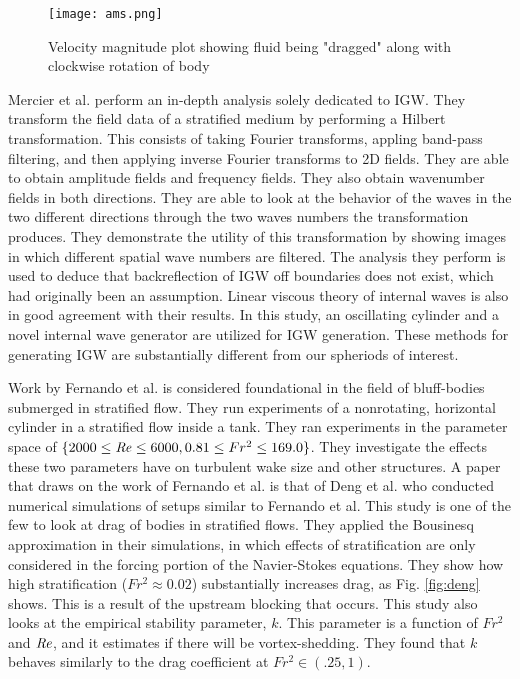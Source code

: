 \begin{figure}[htbp]
\centering
\texttt{[image: ams.png]}
\caption{Velocity magnitude plot showing fluid being "dragged" along with clockwise rotation of body \cite{mittal_direct_2020}}
\label{fig:ams}
\end{figure}

Mercier et al. \cite{mercier_reflection_2008} perform an in-depth analysis solely dedicated to IGW. They transform the field data of a stratified medium by performing a Hilbert transformation. This consists of taking Fourier transforms, appling band-pass filtering, and then applying inverse Fourier transforms to 2D fields. They are able to obtain amplitude fields and frequency fields. They also obtain wavenumber fields in both directions. They are able to look at the behavior of the waves in the two different directions through the two waves numbers the transformation produces. They demonstrate the utility of this transformation by showing images in which different spatial wave numbers are filtered. The analysis they perform is used to deduce that backreflection of IGW off boundaries does not exist, which had originally been an assumption. Linear viscous theory of internal waves is also in good agreement with their results. In this study, an oscillating cylinder and a novel internal wave generator are utilized for IGW generation. These methods for generating IGW are substantially different from our spheriods of interest. 

Work by Fernando et al. is considered foundational in the field of bluff-bodies submerged in stratified flow. They run experiments of a nonrotating, horizontal cylinder in a stratified flow inside a tank. They ran experiments in the parameter space of $\{2000 \leq \mathit{Re} \leq 6000, 0.81 \leq Fr^2 \leq  169.0\}$. They investigate the effects these two parameters have on turbulent wake size and other structures. A paper that draws on the work of Fernando et al. is that of Deng et al. \cite{deng_drag_2022} who conducted numerical simulations of setups similar to Fernando et al. This study is one of the few to look at drag of bodies in stratified flows. They applied the Bousinesq approximation in their simulations, in which effects of stratification are only considered in the forcing portion of the Navier-Stokes equations. They show how high stratification ($Fr^2 \approx 0.02$) substantially increases drag, as Fig. \ref{fig:deng} shows. This is a result of the upstream blocking that occurs. This study also looks at the empirical stability parameter, $k$. This parameter is a function of $Fr^2$ and $\mathit{Re}$, and it estimates if there will be vortex-shedding. They found that $k$ behaves similarly to the drag coefficient at $Fr^2 \in (.25, 1)$.


